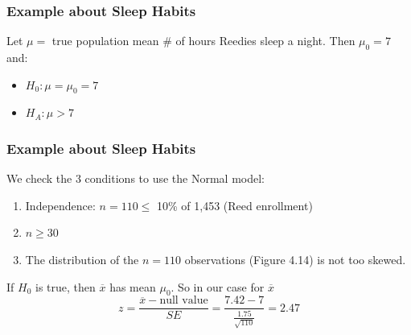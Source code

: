 \documentclass[slides]{beamer}
\newcommand{\blue}[1]{\textcolor{blue2}{#1}}
\newcommand{\xbar}{\overline{x}}
\begin{document}
\begin{frame}
\frametitle{Example about Sleep Habits}

%
%
\vspace{0.5cm}

Let $\mu = $ \blue{true population mean} \# of hours Reedies sleep a night.  Then $\mu_0=7$ and: 
\begin{itemize}
\item $H_0: \mu = \mu_0= 7$
\item $H_A: \mu > 7$
\end{itemize}


\end{frame}


\begin{frame}
\frametitle{Example about Sleep Habits}


%
%
We check the 3 conditions to use the Normal model:
\begin{enumerate}
\pause \item Independence: $n=110 \leq$ 10\% of 1,453 (Reed enrollment)
\pause \item $n \geq 30$
\pause \item The distribution of the $n=110$ observations (Figure 4.14) is not too skewed.
\end{enumerate}

If $H_0$ is true, then $\xbar$ has mean $\mu_0$.  So in our case for $\xbar$
\[
z = \frac{\xbar - \mbox{null value}}{SE} = \frac{7.42 - 7}{\frac{1.75}{\sqrt{110}}} = 2.47
\]

\end{frame}
\end{document}

